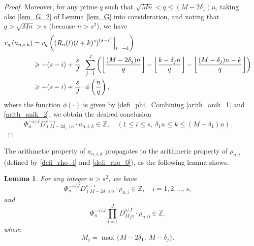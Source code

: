 \documentclass[12pt]{article}
\newtheorem{lemma}[theorem]{Lemma}
\numberwithin{equation}{section}
\begin{document}
\begin{proof}
Moreover, for any prime $q$ such that $\sqrt{Mn} < q \leqslant (M-2\delta_1)n$, taking also \eqref{lem_G_2} of Lemma \ref{lem_G} into consideration, and noting that $q>\sqrt{Mn}>s$ (because $n > s^2$), we have
\begin{align}
v_q\left( a_{n,i,k} \right) &= v_q\left( \left( R_n(t)(t+k)^{s} \right)^{(s-i)} \Big|_{t=-k} \right) \notag\\
&\geqslant -(s-i) + \frac{s}{J}\cdot\sum_{j=1}^{J} \left( \left\lfloor \frac{(M-2\delta_j)n}{q}  \right\rfloor - \left\lfloor \frac{k-\delta_jn}{q}  \right\rfloor - \left\lfloor \frac{(M-\delta_j)n - k}{q}  \right\rfloor \right)  \notag\\
&\geqslant -(s-i) + \frac{s}{J}\cdot\phi\left( \frac{n}{q} \right), \label{arith_anik_2}
\end{align}
where the function $\phi(\cdot)$ is given by \eqref{defi_phi}. Combining \eqref{arith_anik_1} and \eqref{arith_anik_2}, we obtain the desired conclusion
\[ \Phi_n^{-s/J} D_{(M-2\delta_1)n}^{s-i} \cdot  a_{n,i,k} \in \mathbb{Z}, \quad (1 \leqslant i \leqslant s,~\delta_1n \leqslant k \leqslant (M-\delta_1)n).   \]
\end{proof}

\bigskip

The arithmetic property of $a_{n,i,k}$ propagates to the arithmeric property of $\rho_{n,i}$ (defined by \eqref{defi_rho_i} and \eqref{defi_rho_0}), as the following lemma shows.

\begin{lemma}\label{lem_arith_rhoi}
For any integer $n > s^2$, we have
\[ \Phi_n^{-s/J} D_{(M-2\delta_1)n}^{s-i} \cdot \rho_{n,i} \in \mathbb{Z}, \quad i=1,2,\ldots,s, \]
and
\[ \Phi_n^{-s/J} \prod_{j=1}^{J} D_{M_jn}^{s/J} \cdot \rho_{n,0} \in \mathbb{Z}, \]
where 
\[ M_j = \max\{ M-2\delta_1,~M-\delta_j \}. \]
\end{lemma}
\end{document}
